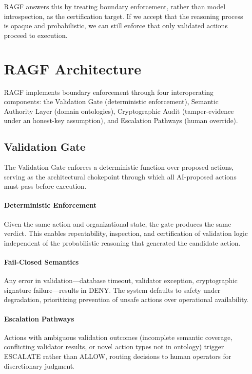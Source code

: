\documentclass[sigconf,nonacm]{acmart}
\begin{document}
RAGF answers this by treating boundary enforcement, rather than model introspection, as the certification target. If we accept that the reasoning process is opaque and probabilistic, we can still enforce that only validated actions proceed to execution.

\section{RAGF Architecture}

RAGF implements boundary enforcement through four interoperating components: the Validation Gate (deterministic enforcement), Semantic Authority Layer (domain ontologies), Cryptographic Audit (tamper-evidence under an honest-key assumption), and Escalation Pathways (human override).

\subsection{Validation Gate}

The Validation Gate enforces a deterministic function over proposed actions, serving as the architectural chokepoint through which all AI-proposed actions must pass before execution.

\paragraph{Deterministic Enforcement} Given the same action and organizational state, the gate produces the same verdict. This enables repeatability, inspection, and certification of validation logic independent of the probabilistic reasoning that generated the candidate action.

\paragraph{Fail-Closed Semantics} Any error in validation---database timeout, validator exception, cryptographic signature failure---results in DENY. The system defaults to safety under degradation, prioritizing prevention of unsafe actions over operational availability.

\paragraph{Escalation Pathways} Actions with ambiguous validation outcomes (incomplete semantic coverage, conflicting validator results, or novel action types not in ontology) trigger ESCALATE rather than ALLOW, routing decisions to human operators for discretionary judgment.
\end{document}
